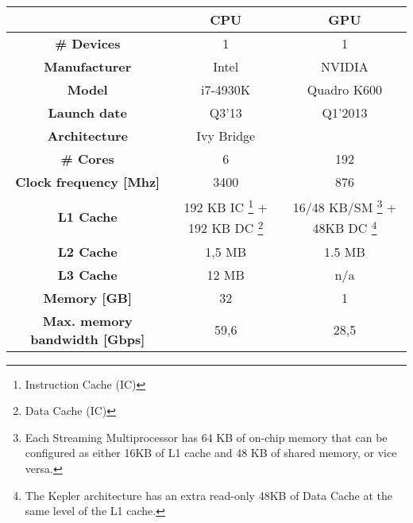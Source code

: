 \begin{minipage}[h]{\hsize}
	\centering
	\begin{tabular}{ccc}
		\toprule[2pt]
												 & \textbf{CPU}      & \textbf{GPU} \\ \midrule
		\textbf{\# Devices}                      & 1                 & 1            \\ 
		\textbf{Manufacturer}                    & Intel             & NVIDIA       \\ 
		\textbf{Model}                           & i7-4930K          & Quadro K600      \\ 
		\textbf{Launch date}                     & Q3'13             & Q1'2013      \\ 
		\textbf{Architecture}                    & Ivy Bridge      &         \\ 
		\textbf{\# Cores}                        & 6                 & 192           \\ 
		\textbf{Clock frequency {[}Mhz{]}}       & 3400              & 876         \\ 
		\textbf{L1 Cache}                        & 192 KB IC \footnote{Instruction Cache (IC)} + 192 KB DC \footnote{Data Cache (IC)} & 16/48 KB/SM \footnote{Each Streaming Multiprocessor has 64 KB of on-chip memory that can be configured as either 16KB of L1 cache and 48 KB of shared memory, or vice versa.} + 48KB DC \footnote{The Kepler architecture has an extra read-only 48KB of Data Cache at the same level of the L1 cache.} \\ 
		\textbf{L2 Cache}                        & 1,5 MB             & 1.5 MB         \\ 
		\textbf{L3 Cache}                        & 12 MB              & n/a          \\ 
		\textbf{Memory {[}GB{]}}                 & 32                & 1            \\ 
		\textbf{Max. memory bandwidth {[}Gbps{]}} & 59,6              & 28,5        \\ 
		\bottomrule[2pt]
	\end{tabular}
	\label{tab:bravo}
\end{minipage}
